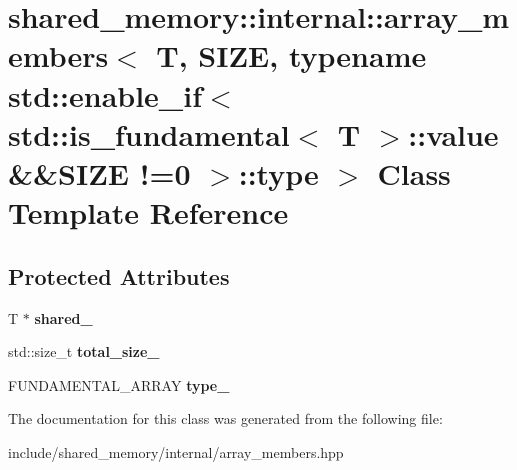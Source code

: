 \hypertarget{classshared__memory_1_1internal_1_1array__members_3_01T_00_01SIZE_00_01typename_01std_1_1enable_8ab74519d0175245a44202cbdf761091}{}\section{shared\+\_\+memory\+:\+:internal\+:\+:array\+\_\+members$<$ T, S\+I\+ZE, typename std\+:\+:enable\+\_\+if$<$ std\+:\+:is\+\_\+fundamental$<$ T $>$\+:\+:value \&\&S\+I\+ZE !=0 $>$\+:\+:type $>$ Class Template Reference}
\label{classshared__memory_1_1internal_1_1array__members_3_01T_00_01SIZE_00_01typename_01std_1_1enable_8ab74519d0175245a44202cbdf761091}
\subsection*{Protected Attributes}
\begin{DoxyCompactItemize}
\item 
\mbox{\label{classshared__memory_1_1internal_1_1array__members_3_01T_00_01SIZE_00_01typename_01std_1_1enable_8ab74519d0175245a44202cbdf761091_a7f0babfb8b4868cfb5418cb57a91fc8e}} 
T $\ast$ {\bfseries shared\+\_\+}
\item 
\mbox{\label{classshared__memory_1_1internal_1_1array__members_3_01T_00_01SIZE_00_01typename_01std_1_1enable_8ab74519d0175245a44202cbdf761091_ab09af3cdbb14f850ee68bbed6d0ac94a}} 
std\+::size\+\_\+t {\bfseries total\+\_\+size\+\_\+}
\item 
\mbox{\label{classshared__memory_1_1internal_1_1array__members_3_01T_00_01SIZE_00_01typename_01std_1_1enable_8ab74519d0175245a44202cbdf761091_a41ef10ecb64c6bcd4adf9ded5153747d}} 
F\+U\+N\+D\+A\+M\+E\+N\+T\+A\+L\+\_\+\+A\+R\+R\+AY {\bfseries type\+\_\+}
\end{DoxyCompactItemize}


The documentation for this class was generated from the following file\+:\begin{DoxyCompactItemize}
\item 
include/shared\+\_\+memory/internal/array\+\_\+members.\+hpp\end{DoxyCompactItemize}

